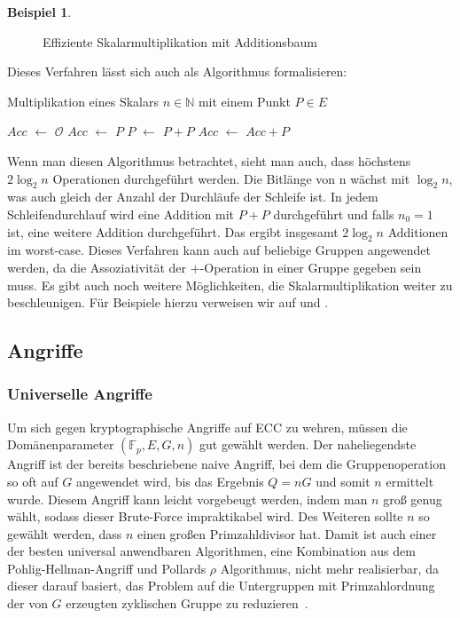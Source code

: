 \documentclass[hidelinks]{article}
\newcommand*\Let[2]{\State #1 $\gets$ #2}
\theoremstyle{plain}
\theoremstyle{definition}
\newtheorem{bsp}[thm]{Beispiel}
\theoremstyle{rem}
\newcommand{\patinf}{\mathcal{O}}
\begin{document}
\begin{sloppypar}
\begin{bsp}
\begin{figure}[H]
\begin{tikzpicture}
        \end{tikzpicture}
        \caption{Effiziente Skalarmultiplikation mit Additionsbaum}
    \end{figure}
\end{bsp}
Dieses Verfahren lässt sich auch als Algorithmus formalisieren:
\begin{algorithm}[H]
    \caption{Multiplikation eines Skalars $n \in \mathbb{N}$ mit einem Punkt $P \in E$ }
    \begin{algorithmic}[1]
        \Statex
        \Let{$Acc$}{$\patinf$} 
        \Else
        \Let{$Acc$}{$P$}
    \EndIf
    \Let{$P$}{$P + P$} 
    \Let{$Acc$}{$Acc + P$}
\EndIf
      \EndFor
      \State {}
  \EndFunction
  \end{algorithmic}
\end{algorithm}
Wenn man diesen Algorithmus betrachtet, sieht man auch, dass höchstens $2\log_2{n}$ Operationen durchgeführt werden. Die Bitlänge von n wächst mit $\log_2{n}$, was auch gleich der Anzahl der Durchläufe der Schleife ist. In jedem Schleifendurchlauf wird eine Addition mit $P+P$ durchgeführt und falls $n_0 = 1$ ist, eine weitere Addition durchgeführt. Das ergibt insgesamt $2\log_2{n}$ Additionen im worst-case. Dieses Verfahren kann auch auf beliebige Gruppen angewendet
werden, da die Assoziativität der $+$-Operation in einer Gruppe gegeben sein muss. Es gibt auch noch weitere Möglichkeiten, die Skalarmultiplikation weiter zu beschleunigen. Für Beispiele hierzu verweisen wir auf \cite{gallant2001} und \cite{dimitrov2005}.

\subsection{Angriffe}
\subsubsection{Universelle Angriffe} 
Um sich gegen kryptographische Angriffe auf ECC zu wehren, müssen die Domänenparameter $(\mathbb{F}_p, E, G, n)$ gut gewählt werden. 
Der naheliegendste Angriff ist der bereits beschriebene naive Angriff, bei dem die Gruppenoperation so oft auf $G$ angewendet wird, bis das Ergebnis $Q = nG$ und somit $n$ ermittelt wurde.
Diesem Angriff kann leicht vorgebeugt werden, indem man $n$ groß genug wählt, sodass dieser Brute-Force impraktikabel wird.
Des Weiteren sollte $n$ so gewählt werden, dass $n$ einen großen Primzahldivisor hat. Damit ist auch einer der besten universal anwendbaren Algorithmen, eine Kombination aus dem Pohlig-Hellman-Angriff und Pollards $\rho$ Algorithmus, nicht mehr realisierbar, da dieser darauf basiert, das Problem auf die Untergruppen mit Primzahlordnung der von $G$ erzeugten zyklischen Gruppe zu reduzieren~\cite[Seite~154-165]{hankersonguide}. 


\end{sloppypar}
\end{document}
